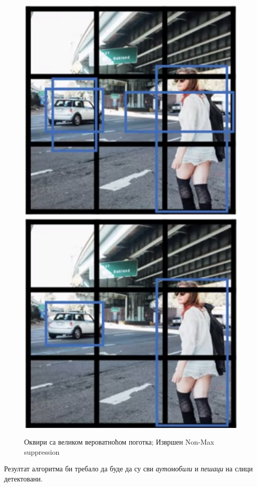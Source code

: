 \documentclass[12pt, а4paper]{article}
\begin{document}
\begin{figure}[H]
  \centering
      \includegraphics[scale=0.5]{slike/ngYOLO3.png}
      \includegraphics[scale=0.5]{slike/ngYOLO4.png}
  \caption{Оквири са великом вероватноћом поготка; Извршен Non-Max suppression}
  \label{fig:ng_YOLO34}
\end{figure}

Резултат алгоритма би требало да буде да су сви \textit{аутомобили} и
\textit{пешаци} на слици детектовани.
\end{document}
